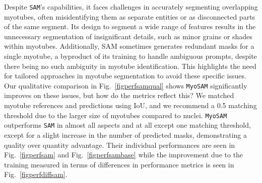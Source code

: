Despite \texttt{SAM}'s capabilities, it faces challenges in accurately segmenting overlapping myotubes, often misidentifying them as separate entities or as disconnected parts of the same segment. Its design to segment a wide range of features results in the unnecessary segmentation of insignificant details, such as minor grains or shades within myotubes. Additionally, SAM sometimes generates redundant masks for a single myotube, a byproduct of its training to handle ambiguous prompts, despite there being no such ambiguity in myotube identification. This highlights the need for tailored approaches in myotube segmentation to avoid these specific issues. Our qualitative comparison in Fig.~\ref{figperfsamqual} shows \texttt{MyoSAM} significantly improves on these issues, but how do the metrics reflect this? We matched myotube references and predictions using IoU, and we recommend a 0.5 matching threshold due to the larger size of myotubes compared to nuclei. \texttt{MyoSAM} outperforms \texttt{SAM} in almost all aspects and at all except one matching threshold, except for a slight increase in the number of predicted masks, demonstrating a quality over quantity advantage. Their individual performances are seen in Fig.~\ref{figperfsam} and Fig.~\ref{figperfsambase} while the improvement due to the training measured in terms of differences in performance metrics is seen in Fig.~\ref{figperfdiffsam}.

